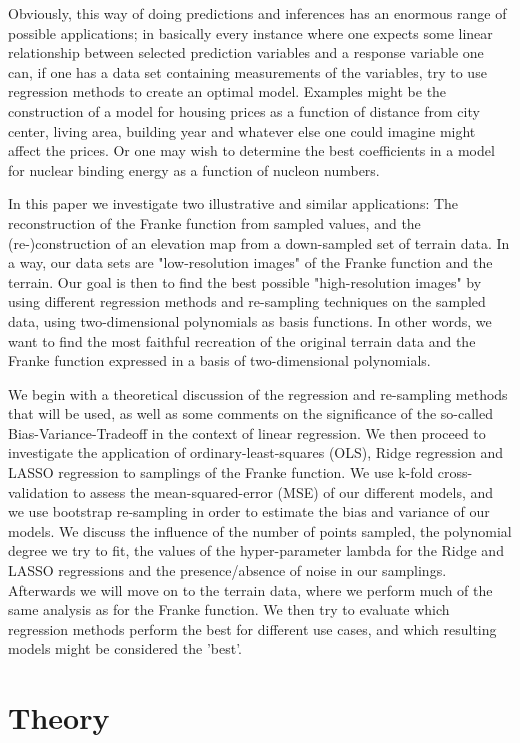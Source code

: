 \documentclass[reprint, english, nofootinbib]{revtex4-2}
\begin{document}
     Obviously, this way of doing predictions and inferences has an enormous range of possible applications; in basically every instance where one expects some linear relationship between selected prediction variables and a response variable one can, if one has a data set containing measurements of the variables, try to use regression methods to create an optimal model. Examples might be the construction of a model for housing prices as a function of distance from city center, living area, building year and whatever else one could imagine might affect the prices. Or one may wish to determine the best coefficients in a model for nuclear binding energy as a function of nucleon numbers.

     In this paper we investigate two illustrative and similar applications: The reconstruction of the Franke function from sampled values, and the (re-)construction of an elevation map from a down-sampled set of terrain data. In a way, our data sets are "low-resolution images" of the Franke function and the terrain. Our goal is then to find the best possible "high-resolution images" by using different regression methods and re-sampling techniques on the sampled data, using two-dimensional polynomials as basis functions. In other words, we want to find the most faithful recreation of the original terrain data and the Franke function expressed in a basis of two-dimensional polynomials.

     We begin with a theoretical discussion of the regression and re-sampling methods that will be used, as well as some comments on the significance of the so-called Bias-Variance-Tradeoff in the context of linear regression. We then proceed to investigate the application of ordinary-least-squares (OLS), Ridge regression and LASSO regression to samplings of the Franke function. We use k-fold cross-validation to assess the mean-squared-error (MSE) of our different models, and we use bootstrap re-sampling in order to estimate the bias and variance of our models. We discuss the influence of the number of points sampled, the polynomial degree we try to fit, the values of the hyper-parameter lambda for the Ridge and LASSO regressions and the presence/absence of noise in our samplings. Afterwards we will move on to the terrain data, where we perform much of the same analysis as for the Franke function. We then try to evaluate which regression methods perform the best for different use cases, and which resulting models might be considered the 'best'.


\section{Theory}
\end{document}
